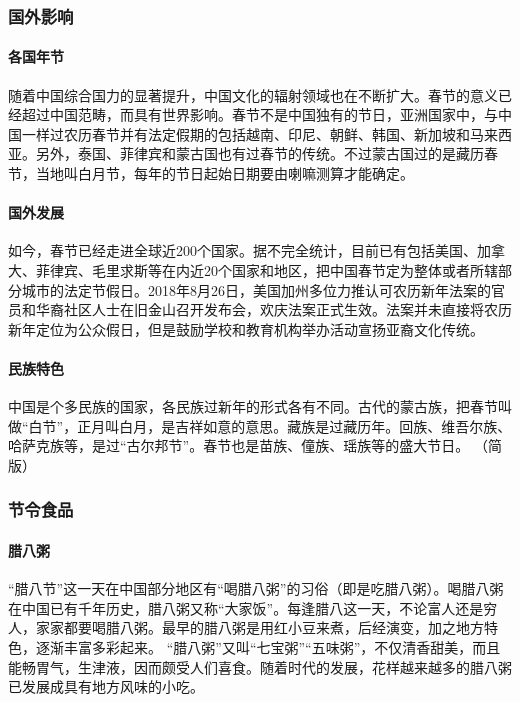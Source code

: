 \subsubsection{国外影响}

\paragraph{各国年节}
随着中国综合国力的显著提升，中国文化的辐射领域也在不断扩大。春节的意义已经超过中国范畴，而具有世界影响。春节不是中国独有的节日，亚洲国家中，与中国一样过农历春节并有法定假期的包括越南、印尼、朝鲜、韩国、新加坡和马来西亚。另外，泰国、菲律宾和蒙古国也有过春节的传统。不过蒙古国过的是藏历春节，当地叫白月节，每年的节日起始日期要由喇嘛测算才能确定。

\paragraph{国外发展}
如今，春节已经走进全球近200个国家。据不完全统计，目前已有包括美国、加拿大、菲律宾、毛里求斯等在内近20个国家和地区，把中国春节定为整体或者所辖部分城市的法定节假日。2018年8月26日，美国加州多位力推认可农历新年法案的官员和华裔社区人士在旧金山召开发布会，欢庆法案正式生效。法案并未直接将农历新年定位为公众假日，但是鼓励学校和教育机构举办活动宣扬亚裔文化传统。

\paragraph{民族特色}
中国是个多民族的国家，各民族过新年的形式各有不同。古代的蒙古族，把春节叫做“白节”，正月叫白月，是吉祥如意的意思。藏族是过藏历年。回族、维吾尔族、哈萨克族等，是过“古尔邦节”。春节也是苗族、僮族、瑶族等的盛大节日。                                                        （简版）



\subsubsection{节令食品}

\paragraph{腊八粥}
“腊八节”这一天在中国部分地区有“喝腊八粥”的习俗（即是吃腊八粥）。喝腊八粥在中国已有千年历史，腊八粥又称“大家饭”。每逢腊八这一天，不论富人还是穷人，家家都要喝腊八粥。最早的腊八粥是用红小豆来煮，后经演变，加之地方特色，逐渐丰富多彩起来。
“腊八粥”又叫“七宝粥”“五味粥”，不仅清香甜美，而且能畅胃气，生津液，因而颇受人们喜食。随着时代的发展，花样越来越多的腊八粥已发展成具有地方风味的小吃。

